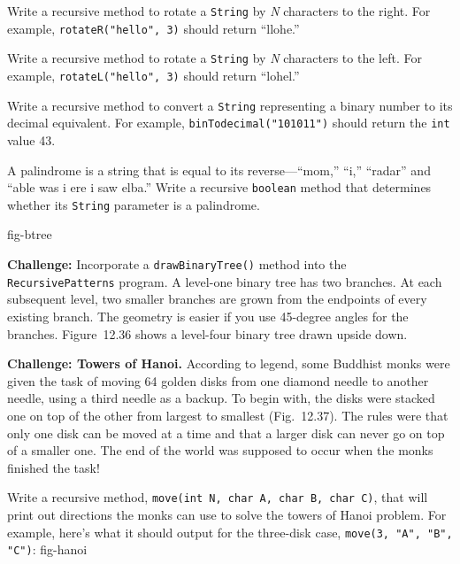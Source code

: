 \begin{EXRtwo}
\item  Write a recursive method to rotate a {\tt String} by {\it N} characters
to the right.  For example, {\tt rotateR("hello", 3)} should return
``llohe.''

\item  Write a recursive method to rotate a {\tt String} by {\it N} characters
to the left.  For example, {\tt rotateL("hello", 3)} should return
``lohel.''

\item  Write a recursive method to convert a {\tt String} representing
a binary number to its decimal equivalent.   For example,
{\tt binTodecimal("101011")} should return the {\tt int} value 43.

\item  A palindrome is a string that is equal to its reverse---``mom,'' ``i,'' 
``radar'' and ``able was i ere i saw elba.'' Write a recursive
{\tt boolean} method that determines whether its {\tt String}
parameter is a palindrome.


{fig-btree}

\item  {\bf Challenge: } Incorporate a {\tt drawBinaryTree()} method
into the {\tt RecursivePatterns} program.  A level-one binary tree has
two branches.  At each subsequent level, two smaller branches are grown
from the endpoints of every existing branch.  The geometry is easier if
you use 45-degree angles for the branches.  Figure~12.36
shows a level-four binary tree drawn upside down.

\item  {\bf Challenge: Towers of Hanoi.} According to
legend, some Buddhist monks were given the task of moving 64
golden disks from one diamond needle to another needle, using a third
needle as a backup.  To begin with, the disks were stacked one on top of
the other from largest to smallest (Fig.~12.37). The
rules were that only one disk can be moved at a time and that
a larger disk can never go on top of a smaller one.  The end of the
world was supposed to occur when the monks finished the task!

\hspace*{12pt}Write a recursive method,
{\tt move(int N, char A, char B, char C)}, that will print out
directions the monks can use to solve the towers of Hanoi problem.  For
example, here's what it should output for the three-disk case,
{\tt move(3, "A", "B", "C")}:
{fig-hanoi}


\end{EXRtwo}
